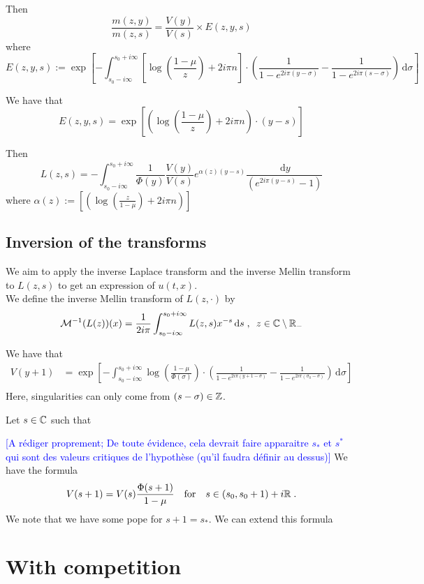 \documentclass[11pt]{amsart}
\newcommand{\diff}{\,\mathrm{d}}
\newcommand{\ndr}[1]{\textcolor{blue}{[#1]}}
\begin{document}
Then 
\begin{equation*}
    \frac{m(z,y)}{m(z,s)} 
    = 
    \frac{V(y)}{V(s)} \times E(z,y,s)
\end{equation*}
where $$E(z,y,s) := \exp \left[
    - \int_{s_0-i\infty}^{s_0+i\infty} \left[\log \left( \frac{1-\mu}{z}\right) + 2i\pi n\right]
    \cdot \left(
        \frac{1}{1-e^{2i\pi(y-\sigma)}} - \frac{1}{1-e^{2i\pi(s-\sigma)}}
     \right) \diff \sigma \right]
     $$

We have that
\begin{equation*}
    E(z,y,s) 
    = 
    \exp
        \left[
     \left(\log \left( \frac{1-\mu}{z}\right) + 2i\pi n\right)
    \cdot (y-s)\right]
\end{equation*}

Then 
\begin{equation}\label{eq:exprL}
    L(z,s) 
    = 
   - \int_{s_0-i\infty}^{s_0+i\infty} \frac{1}{\Phi(y)} \frac{V(y)}{V(s)} e^{ \alpha(z)(y-s)}
   \frac{\diff y}{(e^{2i\pi(y-s)}-1)}
\end{equation}
where $\alpha(z) :=  \left[
    \left(\log \left( \frac{z}{1-\mu}\right) + 2i\pi n\right)
    \right]$
\subsection{Inversion of the transforms}

We aim to apply the inverse Laplace transform and the inverse Mellin transform to $L(z,s)$ to get an expression of $u(t,x)$.\\

We define the inverse Mellin transform of $L(z,\cdot)$ by 
\begin{equation*}
    \Mcal^{-1}(L(z))(x) = \frac{1}{2i\pi} \int_{s_0-i\infty}^{s_0+i\infty} L(z,s)x^{-s}\diff s
    \eqsepv
    z \in \CC \setminus \RR_-
\end{equation*}

We have that 
\begin{align*}
    V(y+1) 
    &= 
    \exp \left[
        - \int_{s_0-i\infty}^{s_0+i\infty}\log \left( \frac{1-\mu}{\Phi(\sigma)}\right)
        \cdot \left(
            \frac{1}{1-e^{2i\pi(y+1-\sigma)}} - \frac{1}{1-e^{2i\pi(\sigma_0-\sigma)}}
         \right) \diff \sigma \right]  \\
\end{align*}
Here, singularities can only come from $(s-\sigma) \in \mathbb{Z}$. 

 Let $s \in \mathbb{C}$ such that

\ndr{A rédiger proprement; De toute évidence, cela devrait faire apparaitre $s_*$ et $s^*$ qui sont des valeurs critiques de l'hypothèse (qu'il faudra définir au dessus)}
 We have the formula 
 \begin{equation}
     V(s+1) = V(s)\frac{\Phi(s+1)}{1-\mu}
     \quad \text{for} \quad
     s \in (s_0, s_0+1) + i\mathbb{R}
     \; .
 \end{equation}
 We note that we have some pope for $s+1 = s_*$.
 We can extend this formula 



\section{With competition}





\end{document}
